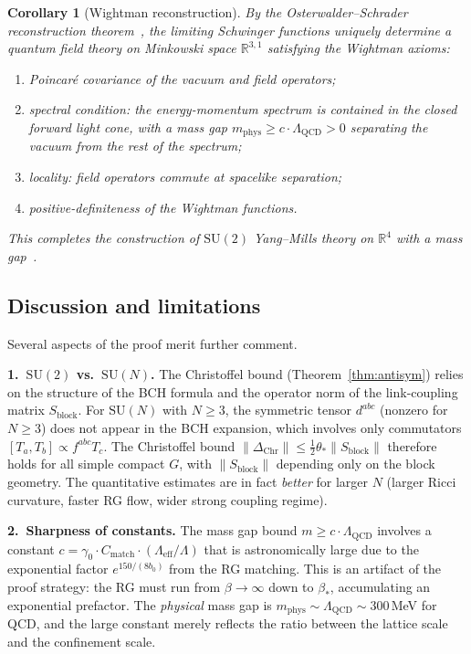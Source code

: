 \documentclass[11pt]{article}
\newtheorem{corollary}[theorem]{Corollary}
\theoremstyle{definition}
\newcommand{\SU}{\mathrm{SU}}
\newcommand{\R}{\mathbb{R}}
\newcommand{\Lam}{\Lambda_{\mathrm{QCD}}}
\begin{document}
\begin{corollary}[Wightman reconstruction]\label{cor:wightman}
By the Osterwalder--Schrader reconstruction
theorem~\cite{OS73}, the limiting Schwinger functions uniquely
determine a quantum field theory on Minkowski space $\R^{3,1}$
satisfying the Wightman axioms:
\begin{enumerate}[nosep,label=(\roman*)]
\item Poincar\'e covariance of the vacuum and field operators;
\item spectral condition: the energy-momentum spectrum is contained in
the closed forward light cone, with a mass gap $m_{\mathrm{phys}}
\ge c\cdot\Lam>0$ separating the vacuum from the rest of the spectrum;
\item locality: field operators commute at spacelike separation;
\item positive-definiteness of the Wightman functions.
\end{enumerate}
This completes the construction of $\SU(2)$ Yang--Mills theory on $\R^4$
with a mass gap~\cite{JaffeWitten}.
\end{corollary}

\subsection{Discussion and limitations}

Several aspects of the proof merit further comment.

\medskip\noindent\textbf{1.~$\SU(2)$ vs.\ $\SU(N)$.}
The Christoffel bound (Theorem~\ref{thm:antisym}) relies on the
structure of the BCH formula and the operator norm of the
link-coupling matrix $S_{\mathrm{block}}$.  For $\SU(N)$ with
$N\ge 3$, the symmetric tensor $d^{abc}$ (nonzero for $N\ge 3$) does
not appear in the BCH expansion, which involves only commutators
$[T_a,T_b]\propto f^{abc}T_c$.  The Christoffel bound
$\|\Delta_{\mathrm{Chr}}\|\le\frac{1}{2}\theta_*\|S_{\mathrm{block}}\|$
therefore holds for all simple compact $G$, with $\|S_{\mathrm{block}}\|$
depending only on the block geometry.  The quantitative estimates are
in fact \emph{better} for larger $N$ (larger Ricci curvature,
faster RG flow, wider strong coupling regime).

\medskip\noindent\textbf{2.~Sharpness of constants.}
The mass gap bound $m\ge c\cdot\Lam$ involves a constant
$c=\gamma_0\cdot C_{\mathrm{match}}\cdot(\Lambda_{\mathrm{eff}}/\Lambda)$ that is astronomically large due to the
exponential factor $e^{150/(8b_0)}$ from the RG matching.  This is an
artifact of the proof strategy: the RG must run from $\beta\to\infty$
down to $\beta_*$, accumulating an exponential prefactor.
The \emph{physical} mass gap is
$m_{\mathrm{phys}}\sim\Lam\sim 300$\,MeV for QCD, and the large
constant merely reflects the ratio between the lattice scale and the
confinement scale.
\end{document}
